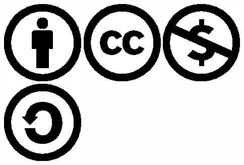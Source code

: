 \begin{center}
\includegraphics{cc-icons-eps/by}
\includegraphics{cc-icons-eps/cc}
\includegraphics{cc-icons-eps/nc}
\includegraphics{cc-icons-eps/sa}
\end{center}

